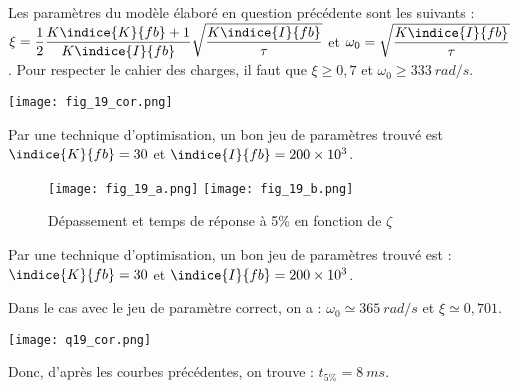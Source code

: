 \ifprof
\begin{corrige}
Les paramètres du modèle élaboré en question précédente sont les suivants :
$\xi=\dfrac{1}{2} \dfrac{K\indice{K}{fb}+1}{K\indice{I}{fb}} \sqrt{\dfrac{K\indice{I}{fb}}{\tau}}$
et
$\omega_0=\sqrt{\dfrac{K\indice{I}{fb}}{\tau}}$ .
Pour respecter le cahier des charges, il faut que $\xi \geq 0,7$ et $\omega_0\geq \SI{333}{rad/s}$.

\begin{center}
\texttt{[image: fig\_19\_cor.png]}
\end{center}

Par une technique d’optimisation, un bon jeu de paramètres trouvé est $\indice{K}{fb} = 30$ et $\indice{I}{fb} = 200\times 10^3$.




\end{corrige}
\else
\fi

\ifprof
\else
\begin{figure}[H]
\centering
\texttt{[image: fig\_19\_a.png]}
\texttt{[image: fig\_19\_b.png]}
\caption{Dépassement et temps de réponse à 5\% en fonction de $\zeta$ \label{fig_19}}
\end{figure}


Par une technique d’optimisation, un bon jeu de paramètres trouvé est : $\indice{K}{fb}=30$ et $\indice{I}{fb}=200\times10^{3}$.
\fi

\ifprof
\begin{corrige}
Dans le cas avec le jeu de paramètre correct, on a : $\omega_0 \simeq \SI{365}{rad/s}$ et  $\xi \simeq 0,701$.

\begin{center}
\texttt{[image: q19\_cor.png]}
\end{center}

Donc, d’après les courbes précédentes, on trouve : $t_{5\%} = \SI{8}{ms}$.

\end{corrige}
\else
\fi

